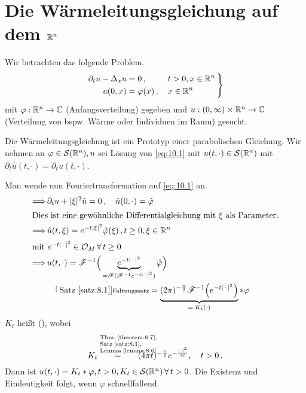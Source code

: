 
\section{Die Wärmeleitungsgleichung auf dem $\mathbb{R}^n$}

Wir betrachten das folgende Problem.
\begin{align}
\label{eq:10.1}
	\left.
	\begin{aligned}
		\partial_t u - \Delta_x u & = 0 \, , \qquad \ \, t > 0 , x \in \mathbb{R}^n \\
		u(0,x) & = \varphi (x) \, , \quad x \in \mathbb{R}^n
	\end{aligned}
	\, \right\}
\end{align}
mit $\varphi: \mathbb{R}^n \rightarrow \mathbb{C}$ (Anfangsverteilung) gegeben und $u :(0,\infty) \times \mathbb{R}^n \rightarrow \mathbb{C}$ (Verteilung von bspw. Wärme oder Individuen im Raum) gesucht.

Die Wärmeleitungsgleichung ist ein Prototyp einer parabolischen Gleichung. Wir nehmen an $\varphi \in \mathcal S(\mathbb{R}^n), u $ sei Lösung von \eqref{eq:10.1} mit $u(t,\cdot) \in \mathcal S(\mathbb{R}^n)$ mit $\partial_t \hat u(t,\cdot ) = \widehat{\partial_t u} (t,\cdot)$.

Man wende nun Fouriertransformation auf \eqref{eq:10.1} an.
\begin{align*}
	\Longrightarrow \, & \partial_t u + \lvert \xi\rvert^2 \hat u = 0 \, , \quad \hat u (0,\cdot) = \hat \varphi \\
	\intertext{Dies ist eine gewöhnliche Differentialgleichung mit $\xi$ als Parameter.}
	\Longrightarrow \, & \hat u (t, \xi) = e^{-t\lvert \xi\rvert^2}\hat\varphi (\xi) \, , t \geq 0, \xi \in \mathbb{R}^n \\
	\intertext{mit $e^{-t\lvert \, \cdot\, \rvert^2} \in \mathcal O_M \, \forall \, t \geq 0$}
	\Longrightarrow \, & u(t,\cdot) = \mathscr{F}^{-1} \Big( \underbrace{e^{-t\lvert \, \cdot \, \rvert^2}}_{=\mathscr{F} (\mathscr{F}^{-1} e^{-t \lvert \, \cdot \, \rvert^2})} \hat \varphi \Big) \\
	&\hspace{0.7em} \stackrel[\scriptsize\text{Satz}~\ref{satz:8.1}]{\scriptsize\text{Faltungssatz}}= \underbrace{(2\pi)^{-\frac n2} \mathscr{F}^{-1} \Big(e^{-t\lvert \, \cdot\, \rvert^2}\Big)}_{=: K_t(\cdot)} \ast \varphi
\end{align*}
$K_t$ heißt  (), wobei
\[
	K_t \stackrel{\parbox{1.5cm}{\centering\scriptsize Thm.~\ref{theorem:8.7}, Satz~\ref{satz:8.1}, Lemma~\ref{lemma:8.6}}}= (4\pi t)^{-\frac n2} e^{-\frac{\abs{\cdot }^2}{4t}} , \quad t > 0 \, .
\]
Dann ist $u(t,\cdot) = K_t \ast \varphi, t > 0, K_t \in \mathcal S(\mathbb{R}^n) \, \forall \, t > 0$. Die Existenz und Eindeutigkeit folgt, wenn $\varphi$ schnellfallend.

